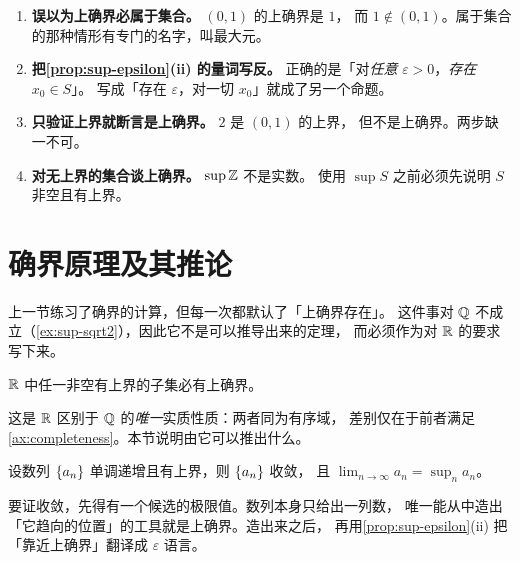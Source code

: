 \begin{pitfall}
  \begin{enumerate}[label=(\arabic*), leftmargin=1.6em]
    \item \textbf{误以为上确界必属于集合。} \((0,1)\) 的上确界是 \(1\)，
          而 \(1 \notin (0,1)\)。属于集合的那种情形有专门的名字，叫最大元。
    \item \textbf{把\cref{prop:sup-epsilon}(ii) 的量词写反。}
          正确的是「对\emph{任意} \(\varepsilon > 0\)，\emph{存在} \(x_{0} \in S\)」。
          写成「存在 \(\varepsilon\)，对一切 \(x_{0}\)」就成了另一个命题。
    \item \textbf{只验证上界就断言是上确界。} \(2\) 是 \((0,1)\) 的上界，
          但不是上确界。两步缺一不可。
    \item \textbf{对无上界的集合谈上确界。} \(\sup \mathbb{Z}\) 不是实数。
          使用 \(\sup S\) 之前必须先说明 \(S\) 非空且有上界。
  \end{enumerate}
\end{pitfall}

\section{确界原理及其推论}
\label{sec:sup-principle}

上一节练习了确界的计算，但每一次都默认了「上确界存在」。
这件事对 \(\mathbb{Q}\) 不成立（\cref{ex:sup-sqrt2}），因此它不是可以推导出来的定理，
而必须作为对 \(\mathbb{R}\) 的要求写下来。

\begin{assumption}[确界公理]
  \label{ax:completeness}
  \(\mathbb{R}\) 中任一非空有上界的子集必有上确界。
\end{assumption}

这是 \(\mathbb{R}\) 区别于 \(\mathbb{Q}\) 的\emph{唯一}实质性质：两者同为有序域，
差别仅在于前者满足\cref{ax:completeness}。本节说明由它可以推出什么。

\begin{theorem}[单调有界定理]
  \label{thm:monotone-convergence}
  设数列 \(\{a_{n}\}\) 单调递增且有上界，则 \(\{a_{n}\}\) 收敛，
  且 \(\lim_{n \to \infty} a_{n} = \sup_{n} a_{n}\)。
\end{theorem}

\begin{strategy}
  要证收敛，先得有一个候选的极限值。数列本身只给出一列数，
  唯一能从中造出「它趋向的位置」的工具就是上确界。造出来之后，
  再用\cref{prop:sup-epsilon}(ii) 把「靠近上确界」翻译成 \(\varepsilon\) 语言。
\end{strategy}

